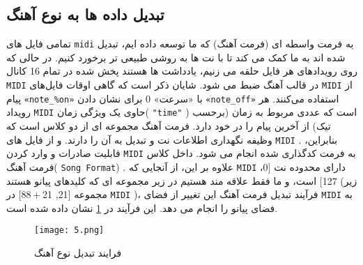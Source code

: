 \subsection{تبدیل داده ها به نوع آهنگ}
تمامی فایل های 
\verb;midi;
به فرمت واسطه ای (فرمت آهنگ) که ما توسعه داده ایم، تبدیل شده اند
به ما کمک می کند تا با نت ها به روشی طبیعی تر برخورد کنیم. در حالی که روی رویدادهای هر فایل حلقه می زنیم، یادداشت ها هستند
پخش شده در تمام 16 کانال 
\verb;MIDI;
در قالب آهنگ ضبط می شود. شایان ذکر است که گاهی اوقات
فایل‌های 
\verb;MIDI; از پیام%
\verb;«note_%on»;
با «سرعت» 0 برای نشان دادن 
\verb;«note_off»; 
استفاده می‌کنند. هر رویداد 
\verb;MIDI;
 حاوی یک ویژگی زمان( 
\verb;"time";
)
است که عددی مربوط به زمان (برحسب تیک) از آخرین پیام را در خود دارد. 
فرمت آهنگ مجموعه ای از دو کلاس است که وظیفه نگهداری اطلاعات نت و تبدیل به آن را دارند. 
و از فایل های 
\verb;MIDI;
. بنابراین، قابلیت صادرات و وارد کردن
\verb;MIDI;
به فرمت کدگذاری شده انجام می شود.
داخل کلاس فرمت آهنگ( 
\verb;Song Format;)
. علاوه بر این، از آنجایی که 
\verb;MIDI;
دارای محدوده نت [0، 127] است، و ما فقط علاقه مند هستیم
در زیر مجموعه ای که کلیدهای پیانو هستند 
(زیر مجموعه [21, 21 + 88] در 
\verb;MIDI;
)، فرآیند تبدیل فرمت آهنگ
این تغییر از فضای 
\verb;MIDI;
به فضای پیانو را انجام می دهد. این فرآیند در 
\cref{fig.4}
نشان داده شده است.
\begin{figure}[!h]
\texttt{[image: 5.png]}
\caption{فرایند تبدیل نوع آهنگ}\label{fig.4}
\end{figure}
